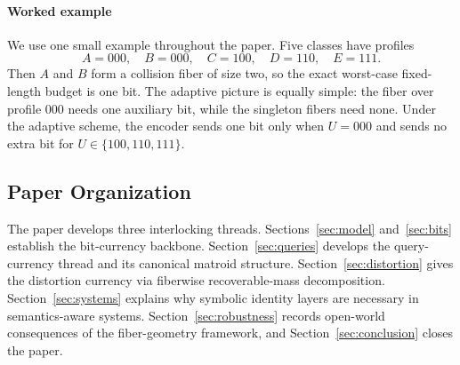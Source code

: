 \paragraph{Worked example}

We use one small example throughout the paper. Five classes have profiles
\[
A=000,\quad B=000,\quad C=100,\quad D=110,\quad E=111.
\]
Then $A$ and $B$ form a collision fiber of size two, so the exact worst-case fixed-length budget is one bit. The adaptive picture is equally simple: the fiber over profile $000$ needs one auxiliary bit, while the singleton fibers need none. Under the adaptive scheme, the encoder sends one bit only when $U=000$ and sends no extra bit for $U\in\{100,110,111\}$.

\subsection{Paper Organization}

The paper develops three interlocking threads. Sections~\ref{sec:model} and~\ref{sec:bits} establish the bit-currency backbone. Section~\ref{sec:queries} develops the query-currency thread and its canonical matroid structure. Section~\ref{sec:distortion} gives the distortion currency via fiberwise recoverable-mass decomposition. Section~\ref{sec:systems} explains why symbolic identity layers are necessary in semantics-aware systems. Section~\ref{sec:robustness} records open-world consequences of the fiber-geometry framework, and Section~\ref{sec:conclusion} closes the paper.
